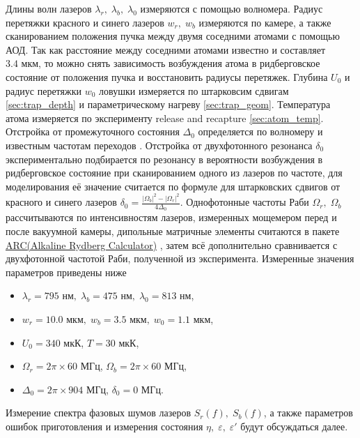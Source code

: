 Длины волн лазеров $\lambda_r, \; \lambda_b, \; \lambda_0$ измеряются с помощью волномера. Радиус перетяжки красного и синего лазеров $w_r, \; w_b$ измеряются по камере, а также сканированием положения пучка между двумя соседними атомами с помощью АОД. Так как расстояние между соседними атомами известно и составляет $3.4 \text{ мкм}$, то можно снять зависимость возбуждения атома в ридберговское состояние от положения пучка и восстановить радиусы перетяжек. Глубина $U_0$ и радиус перетяжки $w_0$ ловушки измеряется по штарковсим сдвигам \ref{sec:trap_depth} и параметрическому нагреву \ref{sec:trap_geom}. Температура атома измеряется по эксперименту release and recapture \ref{sec:atom_temp}. Отстройка от промежуточного состояния $\Delta_0$ определяется по волномеру и известным частотам переходов \cite{Rb87}. Отстройка от двухфотонного резонанса $\delta_0$ экспериментально подбирается по резонансу в вероятности возбуждения в ридберговское состояние при сканированием одного из лазеров по частоте, для моделирования её значение считается по формуле для штарковских сдвигов от красного и синего лазеров $\delta_0 = \frac{|\Omega_b|^2 - |\Omega_r|^2}{4\Delta_0}$. Однофотонные частоты Раби $\Omega_r, \; \Omega_b$ рассчитываются по интенсивностям лазеров, измеренных мощемером перед и после вакуумной камеры, дипольные матричные элементы считаются в пакете \href{https://arc-alkali-rydberg-calculator.readthedocs.io/en/latest/}{ARC(Alkaline Rydberg Calculator)} \cite{ROBERTSON2021107814}, затем всё дополнительно сравнивается с двухфотонной частотой Раби, полученной из эксперимента. Измеренные значения параметров приведены ниже

\begin{itemize}
	\item $\lambda_r = 795\text{ нм}, \; \lambda_b = 475 \text{ нм}, \; \lambda_0 = 813 \text{ нм}$, 
	\item $w_r = 10.0\text{ мкм}, \; w_b = 3.5 \text{ мкм}, \; w_0 = 1.1 \text{ мкм}$,
	\item $U_0 = 340\text{ мкК}$, $T = 30\text{ мкК}$,
	\item $\Omega_r = 2\pi \times 60 \text{ МГц}$, $\Omega_b = 2\pi \times 60\text{ МГц}$,
	\item $\Delta_0 = 2\pi \times 904 \text{ МГц}$, $\delta_0 = 0 \text{ МГц}$.
\end{itemize}

Измерение спектра фазовых шумов лазеров $S_r(f), \; S_b(f)$, а также параметров ошибок приготовления и измерения состояния $\eta, \; \varepsilon, \; \varepsilon'$ будут обсуждаться далее.


